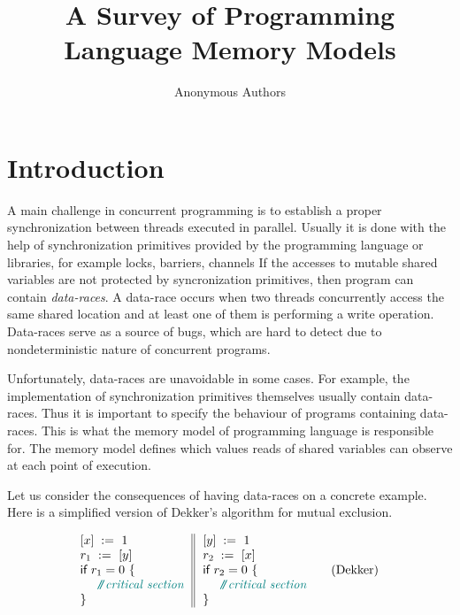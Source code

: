 \documentclass[a4paper,twoside,11pt]{article}
\author{Anonymous Authors}
\title{A Survey of Programming Language Memory Models}
\date{}
\numberwithin{equation}{section}
\begin{document}
\maketitle

\begin{abstract}
\end{abstract}

\section{Introduction}
A main challenge in concurrent programming is 
to establish a proper synchronization between threads executed in parallel.     
Usually it is done with the help of synchronization primitives
provided by the programming language or libraries,
for example locks, barriers, channels \etc
If the accesses to mutable shared variables are not 
protected by syncronization primitives, then program can contain \emph{data-races}.
A data-race occurs when two threads concurrently access the same shared location 
and at least one of them is performing a write operation.
Data-races serve as a source of bugs, 
which are hard to detect due to nondeterministic nature of concurrent programs.

Unfortunately, data-races are unavoidable in some cases. 
For example, the implementation of synchronization primitives 
themselves usually contain data-races.
Thus it is important to specify the behaviour of programs containing data-races.
This is what the memory model of programming language is responsible for.  
The memory model defines which values reads of shared variables can observe at each point of execution. 

Let us consider the consequences of having data-races on a concrete example.
Here is a simplified version of Dekker's algorithm for mutual exclusion.

\begin{equation*}
\inarrII{
  \writeInst{}{x}{1} \\
  \readInst{}{r_1}{y}  \\
  \kw{if} {r_1 = 0} ~\{ \\
  ~~ \comment{critical section} \\
  \}
}{
  \writeInst{}{y}{1} \\
  \readInst{}{r_2}{x}  \\
  \kw{if} {r_2 = 0} ~\{ \\
  ~~ \comment{critical section} \\
  \}
}
\tag{Dekker}\label{ex:Dekker}
\end{equation*}
\end{document}
